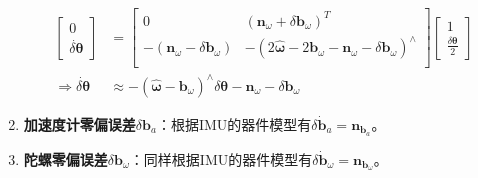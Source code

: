 \begin{enumerate}
\begin{equation}
	\begin{aligned}
	\left[\begin{array}{c}
	0\\\dot{\delta\bm{\theta}}\end{array}\right]&=\left[\begin{matrix}
	0 & \left(\bm{n}_\omega+\delta\bm{b}_\omega\right)^T\\
	-\left(\bm{n}_\omega-\delta\bm{b}_\omega\right) & -\left(2\hat{\bm{\omega}}-2\bm{b}_\omega-\bm{n}_\omega-\delta\bm{b}_\omega\right)^\wedge\\
	\end{matrix}\right]\left[\begin{array}{c}
	1\\\frac{\delta\bm{\theta}}{2}
	\end{array}\right]\\
	\Rightarrow\dot{\delta\bm{\theta}}&\approx-\left(\hat{\bm{\omega}}-\bm{b}_\omega\right)^\wedge\delta\bm{\theta}-\bm{n}_\omega-\delta\bm{b}_\omega
	\end{aligned}
	\end{equation}
	\item \textbf{加速度计零偏误差}$\delta\bm{b}_a$：根据IMU的器件模型有$\delta\dot{\bm{b}}_a=\bm{n}_{\bm{b}_a}$。
	\item \textbf{陀螺零偏误差}$\delta\bm{b}_\omega$：同样根据IMU的器件模型有$\delta\dot{\bm{b}}_\omega=\bm{n}_{\bm{b}_\omega}$。
\end{enumerate}

